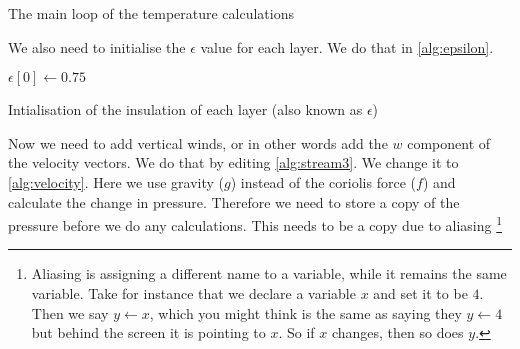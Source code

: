 \begin{algorithm}[hbt]
    \SetAlgoLined

    \caption{The main loop of the temperature calculations}
    \label{alg:temperature layer}
\end{algorithm}

We also need to initialise the $\epsilon$ value for each layer. We do that in \autoref{alg:epsilon}.

\begin{algorithm}
    $\epsilon[0] \leftarrow 0.75$ \;
    \caption{Intialisation of the insulation of each layer (also known as $\epsilon$)}
    \label{alg:epsilon}
\end{algorithm}

Now we need to add vertical winds, or in other words add the $w$ component of the velocity vectors. We do that by editing \autoref{alg:stream3}. We change it to \autoref{alg:velocity}. Here we 
use gravity ($g$) instead of the coriolis force ($f$) and calculate the change in pressure. Therefore we need to store a copy of the pressure before we do any calculations. This needs to be a
copy due to aliasing \footnote{Aliasing is assigning a different name to a variable, while it remains the same variable. Take for instance that we declare a variable $x$ and set it to be $4$. 
Then we say $y \leftarrow x$, which you might think is the same as saying they $y \leftarrow 4$ but behind the screen it is pointing to $x$. So if $x$ changes, then so does $y$.}

